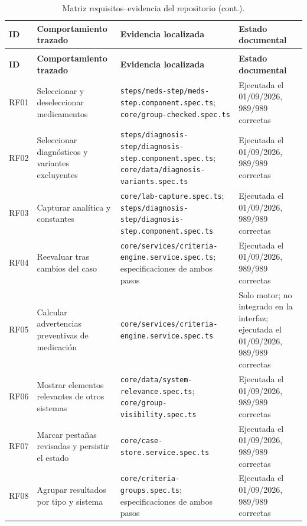 {\scriptsize
\begin{longtable}{@{}p{0.7cm}p{3.2cm}p{5.4cm}p{3.5cm}@{}}
  \caption{Matriz requisitos--evidencia del repositorio.}
  \label{tab:trazabilidad-requisitos} \\
  \toprule
  \textbf{ID} & \textbf{Comportamiento trazado} &
  \textbf{Evidencia localizada} & \textbf{Estado documental} \\
  \midrule
  \endfirsthead
  \caption[]{Matriz requisitos--evidencia del repositorio (cont.).} \\
  \toprule
  \textbf{ID} & \textbf{Comportamiento trazado} &
  \textbf{Evidencia localizada} & \textbf{Estado documental} \\
  \midrule
  \endhead
  \bottomrule
  \endfoot
  RF01 & Seleccionar y deseleccionar medicamentos &
    \texttt{steps/meds-step/meds-step.component.spec.ts};
    \texttt{core/group-checked.spec.ts} &
    Ejecutada el 01/09/2026, 989/989 correctas \\
  RF02 & Seleccionar diagnósticos y variantes excluyentes &
    \texttt{steps/diagnosis-step/diagnosis-step.component.spec.ts};
    \texttt{core/data/diagnosis-variants.spec.ts} &
    Ejecutada el 01/09/2026, 989/989 correctas \\
  RF03 & Capturar analítica y constantes &
    \texttt{core/lab-capture.spec.ts};
    \texttt{steps/diagnosis-step/diagnosis-step.component.spec.ts} &
    Ejecutada el 01/09/2026, 989/989 correctas \\
  RF04 & Reevaluar tras cambios del caso &
    \texttt{core/services/criteria-engine.service.spec.ts};
    especificaciones de ambos pasos &
    Ejecutada el 01/09/2026, 989/989 correctas \\
  RF05 & Calcular advertencias preventivas de medicación &
    \texttt{core/services/criteria-engine.service.spec.ts} &
    Solo motor; no integrado en la interfaz; ejecutada el 01/09/2026, 989/989 correctas \\
  RF06 & Mostrar elementos relevantes de otros sistemas &
    \texttt{core/data/system-relevance.spec.ts};
    \texttt{core/group-visibility.spec.ts} &
    Ejecutada el 01/09/2026, 989/989 correctas \\
  RF07 & Marcar pestañas revisadas y persistir el estado &
    \texttt{core/case-store.service.spec.ts} &
    Ejecutada el 01/09/2026, 989/989 correctas \\
  RF08 & Agrupar resultados por tipo y sistema &
    \texttt{core/criteria-groups.spec.ts};
    especificaciones de ambos pasos &
    Ejecutada el 01/09/2026, 989/989 correctas \\

\end{longtable}}
